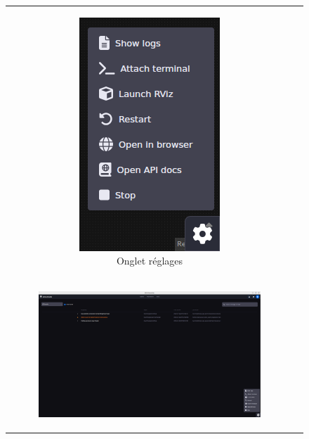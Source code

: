 \begin{figure}[H]
\begin{tabular}{cc}
\begin{subfigure}{0.45\textwidth}
            \includegraphics[width=0.9\linewidth]{assets/figures/AICA_rviz.png}
            \caption{Onglet réglages}
            \label{fig:aica_rviz}
        \end{subfigure} \\
        \addlinespace[0.5em]
        \begin{subfigure}{0.45\textwidth}
            \centering
            \includegraphics[width=0.9\linewidth]{assets/figures/AICA_logs.png}

\end{subfigure}
\end{tabular}
\end{figure}
